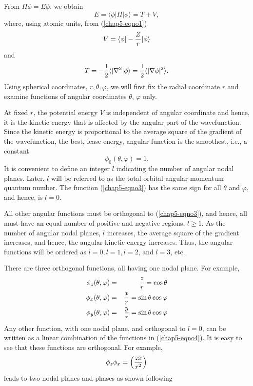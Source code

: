 From $H \phi = E \phi$, we obtain
\begin{equation}
E = \langle \phi | H | \phi \rangle = T + V,
\end{equation}
where, using atomic units, from (\ref{chap5-eqno1})
\begin{equation}
V = \langle \phi | - {Z \over r} | \phi \rangle
\end{equation}
and
\begin{equation}
T = - {1 \over 2} \langle | \nabla^2 | \phi \rangle = {1 \over 2} 
\langle | \nabla \phi |^2 \rangle.
\label{chap5-eqno2}
\end{equation}
Using spherical coordinates, $r, \theta , \varphi$, we will first fix the 
radial coordinate $r$ and examine functions of angular coordinates 
$\theta$, $\varphi$ only.

At fixed $r$, the potential energy $V$ is independent of angular coordinate 
and hence, it is the kinetic energy that is affected by the angular part 
of the wavefunction.  Since the kinetic energy is proportional to the 
average square of the gradient of the wavefunction, the best, lease energy, 
angular function is the smoothest, i.e., a constant
\begin{equation}
\phi_0 ( \theta , \varphi ) = 1.
\label{chap5-eqno3}
\end{equation} It is convenient to define an integer $l$ indicating the number of
angular nodal planes.  Later, $l$ will be referred to as the total
orbital angular momentum quantum number.  The function
(\ref{chap5-eqno3}) has the same sign for all $\theta$ and $\varphi$,
and hence, is $l = 0$.

All other angular functions must be orthogonal to (\ref{chap5-eqno3}),
and hence, all must have an equal number of positive and negative
regions, $l \geq 1$.  As the number of angular nodal planes, $l$
increases, the average square of the gradient increases, and hence,
the angular kinetic energy increases.  Thus, the angular functions
will be ordered as $l = 0, l = 1, l = 2$, and $l = 3$, etc.

There are three orthogonal functions, all having one nodal plane.  For example,
\begin{eqnarray}
\phi_z ( \theta , \varphi ) &=& {z \over r} = \cos \theta\cr
\phi_x ( \theta , \varphi ) &=& {x \over r} = \sin \theta \cos \varphi\cr
\phi_y ( \theta , \varphi ) &=& {y \over r} = \sin \theta \cos \varphi
\label{chap5-eqno4}
\end{eqnarray}
Any other function, with one nodal plane, and orthogonal to $l = 0$,
can be written as a linear combination of the functions in
(\ref{chap5-eqno4}).  It is easy to see that these functions are
orthogonal. For example,
\begin{equation}
\phi_z \phi_x = \left( {zx \over r^2} \right)
\end{equation}
leads to two nodal planes and phases as shown following

